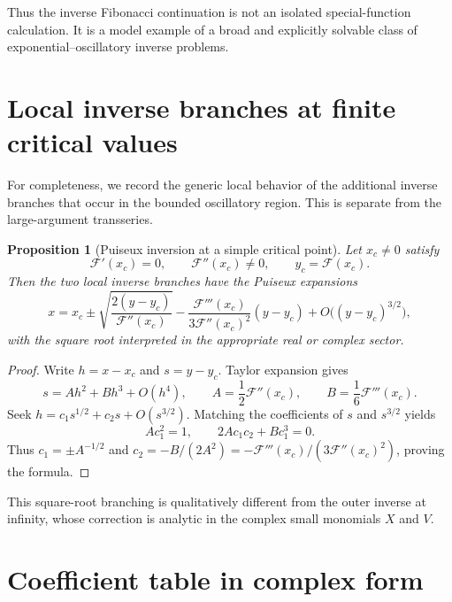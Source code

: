 \documentclass[11pt,oneside]{article}
\theoremstyle{plain}
\newtheorem{proposition}[theorem]{Proposition}
\theoremstyle{definition}
\theoremstyle{remark}
\newcommand{\Fcal}{\mathcal{F}}
\begin{document}
Thus the inverse Fibonacci continuation is not an isolated special-function
calculation.  It is a model example of a broad and explicitly solvable class
of exponential--oscillatory inverse problems.

\appendix

\section{Local inverse branches at finite critical values}
\label{app:finite-branches}

For completeness, we record the generic local behavior of the additional
inverse branches that occur in the bounded oscillatory region.  This is
separate from the large-argument transseries.

\begin{proposition}[Puiseux inversion at a simple critical point]
\label{prop:Puiseux-critical}
Let \(x_c\ne0\) satisfy
\begin{equation}
 \Fcal'(x_c)=0,
 \qquad
 \Fcal''(x_c)\ne0,
 \qquad
 y_c=\Fcal(x_c).
 \label{eq:critical-assumptions}
\end{equation}
Then the two local inverse branches have the Puiseux expansions
\begin{equation}
 x=x_c\pm
 \sqrt{\frac{2(y-y_c)}{\Fcal''(x_c)}}
 -\frac{\Fcal'''(x_c)}{3\Fcal''(x_c)^2}(y-y_c)
 +O\bigl((y-y_c)^{3/2}\bigr),
 \label{eq:critical-Puiseux}
\end{equation}
with the square root interpreted in the appropriate real or complex sector.
\end{proposition}

\begin{proof}
Write \(h=x-x_c\) and \(s=y-y_c\).  Taylor expansion gives
\[
 s=Ah^2+Bh^3+O(h^4),
 \qquad
 A=\frac12\Fcal''(x_c),
 \qquad
 B=\frac16\Fcal'''(x_c).
\]
Seek \(h=c_1s^{1/2}+c_2s+O(s^{3/2})\).  Matching the coefficients of \(s\)
and \(s^{3/2}\) yields
\[
 Ac_1^2=1,
 \qquad
 2Ac_1c_2+Bc_1^3=0.
\]
Thus \(c_1=\pm A^{-1/2}\) and
\(c_2=-B/(2A^2)=-\Fcal'''(x_c)/(3\Fcal''(x_c)^2)\), proving the formula.
\end{proof}

This square-root branching is qualitatively different from the outer inverse
at infinity, whose correction is analytic in the complex small monomials
\(X\) and \(V\).

\section{Coefficient table in complex form}
\label{app:coefficient-table}
\end{document}
